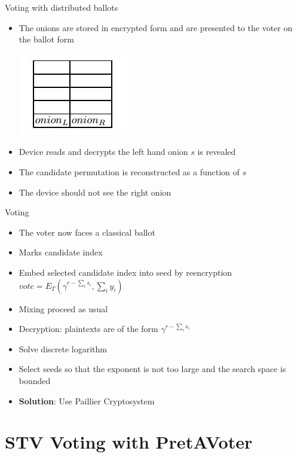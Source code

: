 \documentclass{beamer}
\begin{document}
\begin{frame}[allowframebreaks]{Voting with distributed ballots}
\begin{itemize}
\item The onions are stored in encrypted form and are presented to the voter on the ballot form
\begin{center}
\includegraphics[scale=0.3]{distCandList.jpg}
\end{center}
\item Device reads and decrypts the left hand onion $s$ is revealed
\item The candidate permutation is reconstructed as a function of $s$
\item The device should not see the right onion
\end{itemize}
\begin{block}{Voting}
\begin{itemize}
\item The voter now faces a classical ballot
\item Marks candidate index
\item Embed selected candidate index into seed by reencryption
$vote=E_{T}(\gamma^{r - \sum_i s_i},\sum_i y_i)$
\item Mixing proceed as usual
\item Decryption: plaintexts are of the form $\gamma^{r - \sum_i s_i}$
\item Solve discrete logarithm
\item Select seeds so that the exponent is not too large and the search space is bounded
\item \textbf{Solution}: Use Paillier Cryptosystem
\end{itemize}
\end{block}
\end{frame}
 
\section*{STV Voting with PretAVoter}
\end{document}
